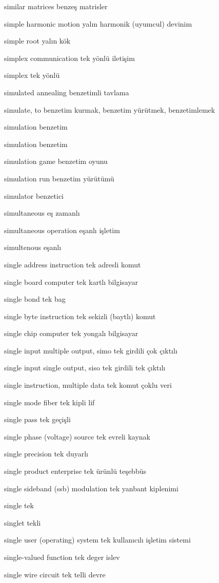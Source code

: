 \documentclass[12pt,fleqn]{article}\usepackage{../../common}
\begin{document}
similar matrices benzeş matrisler

simple harmonic motion yalın harmonik (uyumcul) devinim

simple root yalın kök

simplex communication tek yönlü iletişim

simplex tek yönlü

simulated annealing benzetimli tavlama

simulate, to benzetim kurmak, benzetim yürütmek, benzetimlemek

simulation benzetim

simulation benzetim

simulation game benzetim oyunu

simulation run benzetim yürütümü

simulator benzetici

simultaneous eş zamanlı

simultaneous operation eşanlı işletim

simultenous eşanlı

single address instruction tek adresli komut

single board computer tek kartlı bilgisayar

single bond tek bag

single byte instruction tek sekizli (baytlı) komut

single chip computer tek yongalı bilgisayar

single input multiple output, simo tek girdili çok çıktılı

single input single output, siso tek girdili tek çıktılı

single instruction, multiple data tek komut çoklu veri

single mode fiber tek kipli lif

single pass tek geçişli

single phase (voltage) source tek evreli kaynak

single precision tek duyarlı

single product enterprise tek ürünlü teşebbüs

single sideband (ssb) modulation tek yanbant kiplenimi

single tek

singlet tekli

single user (operating) system tek kullanıcılı işletim sistemi

single-valued function tek deger islev

single wire circuit tek telli devre
\end{document}
